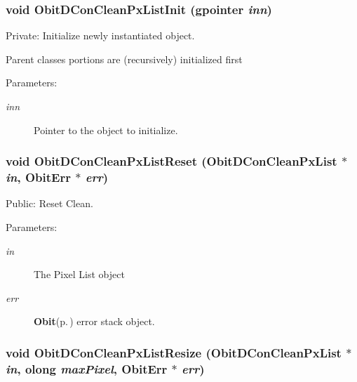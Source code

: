 \subsubsection{\setlength{\rightskip}{0pt plus 5cm}void Obit\-DCon\-Clean\-Px\-List\-Init (gpointer {\em inn})}\label{ObitDConCleanPxList_8c_a3}


Private: Initialize newly instantiated object. 

Parent classes portions are (recursively) initialized first \begin{Desc}
\item[Parameters:]
\begin{description}
\item[{\em inn}]Pointer to the object to initialize. \end{description}
\end{Desc}
\subsubsection{\setlength{\rightskip}{0pt plus 5cm}void Obit\-DCon\-Clean\-Px\-List\-Reset ({\bf Obit\-DCon\-Clean\-Px\-List} $\ast$ {\em in}, {\bf Obit\-Err} $\ast$ {\em err})}\label{ObitDConCleanPxList_8c_a16}


Public: Reset Clean. 

\begin{Desc}
\item[Parameters:]
\begin{description}
\item[{\em in}]The Pixel List object \item[{\em err}]{\bf Obit}{\rm (p.\,\pageref{structObit})} error stack object. \end{description}
\end{Desc}
\subsubsection{\setlength{\rightskip}{0pt plus 5cm}void Obit\-DCon\-Clean\-Px\-List\-Resize ({\bf Obit\-DCon\-Clean\-Px\-List} $\ast$ {\em in}, {\bf olong} {\em max\-Pixel}, {\bf Obit\-Err} $\ast$ {\em err})}\label{ObitDConCleanPxList_8c_a17}


